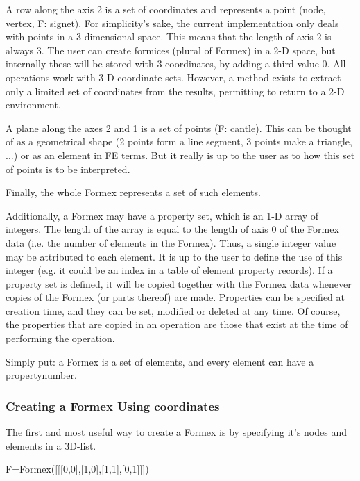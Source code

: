 \documentclass[a4paper]{manual}
\newenvironment{mycode}{\par\small\sffamily}{} %
\begin{document}
{    A row along the axis 2 is a set of coordinates and represents a point
    (node, vertex, F: signet).
    For simplicity's sake, the current implementation only deals with points
    in a 3-dimensional space. This means that the length of axis 2 is always 3.
    The user can create formices (plural of Formex) in a 2-D space, but
    internally these will be stored with 3 coordinates, by adding a third
    value 0. All operations work with 3-D coordinate sets. However, a method
    exists to extract only a limited set of coordinates from the results,
    permitting to return to a 2-D environment.

    A plane along the axes 2 and 1 is a set of points (F: cantle). This can be
    thought of as a geometrical shape (2 points form a line segment, 3 points
    make a triangle, ...) or as an element in FE terms. But it really is up to
    the user as to how this set of points is to be interpreted.

    Finally, the whole Formex represents a set of such elements.

    Additionally, a Formex may have a property set, which is an 1-D array of
    integers. The length of the array is equal to the length of axis 0 of the
    Formex data (i.e. the number of elements in the Formex). Thus, a single
    integer value may be attributed to each element. It is up to the user to
    define the use of this integer (e.g. it could be an index in a table of
    element property records).
    If a property set is defined, it will be copied together with the Formex
    data whenever copies of the Formex (or parts thereof) are made.
    Properties can be specified at creation time, and they can be set,
    modified or deleted at any time. Of course, the properties that are
    copied in an operation are those that exist at the time of performing
    the operation.   

Simply put: a Formex is a set of elements, and every element can have a propertynumber.


\subsubsection{Creating a Formex Using coordinates}

The first and most useful way to create a Formex is by specifying it's nodes and elements in a 3D-list.  

\begin{mycode}
	F=Formex([[[0,0],[1,0],[1,1],[0,1]]])
\end{mycode}

}
\end{document}
